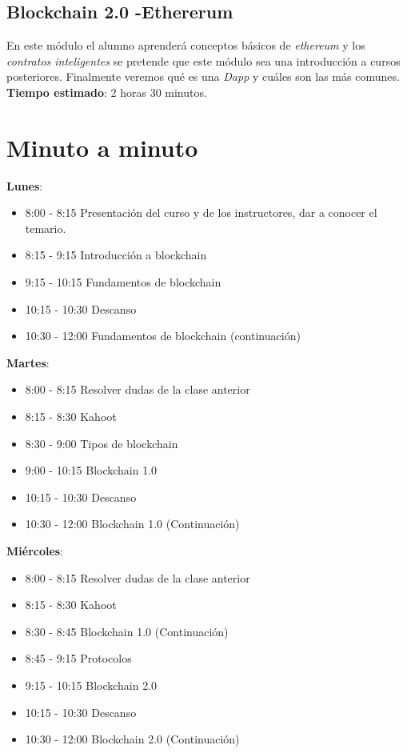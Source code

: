 \documentclass[a4paper,12pt]{/home/armando/Documentos/Cursos/LaTeX/Plantillas/lib/pub}
\begin{document}
\subsection{Blockchain 2.0 -Ethererum}
En este módulo el alumno aprenderá conceptos básicos de \textit{ethereum} y los \textit{contratos inteligentes} se pretende que este módulo sea una introducción a cursos posteriores. Finalmente veremos qué es una \textit{Dapp} y cuáles son las más comunes.\\
\textbf{Tiempo estimado}: 2 horas 30 minutos.

\section{Minuto a minuto}
\textbf{Lunes}:
\begin{itemize}
	\item 8:00 - 8:15 Presentación del curso y de los instructores, dar a conocer el temario.
	\item 8:15 - 9:15 Introducción a blockchain
	\item 9:15 - 10:15 Fundamentos de blockchain
	\item 10:15 - 10:30 Descanso
	\item 10:30 - 12:00 Fundamentos de blockchain (continuación)
\end{itemize}
\textbf{Martes}:
\begin{itemize}
	\item 8:00 - 8:15 Resolver dudas de la clase anterior
	\item 8:15 - 8:30 Kahoot
	\item 8:30 - 9:00 Tipos de blockchain
	\item 9:00 - 10:15  Blockchain 1.0
	\item 10:15 - 10:30 Descanso
	\item 10:30 - 12:00 Blockchain 1.0 (Continuación)
\end{itemize}
\textbf{Miércoles}:
\begin{itemize}
	\item 8:00 - 8:15 Resolver dudas de la clase anterior
	\item 8:15 - 8:30 Kahoot
	\item 8:30 - 8:45 Blockchain 1.0 (Continuación)
	\item 8:45 - 9:15 Protocolos
	\item 9:15 - 10:15 Blockchain 2.0
	\item 10:15 - 10:30 Descanso
	\item 10:30 - 12:00 Blockchain 2.0 (Continuación)
\end{itemize}
\end{document}
